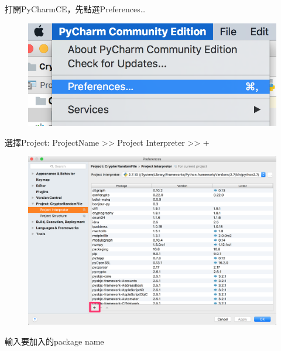 \documentclass[12pt,a4paper]{article}
\begin{document}
{
\fontsize{14pt}{10pt} %
\selectfont %
打開PyCharmCE，先點選Preferences…

\begin{figure}[ht]
	\begin{center}
		\includegraphics[scale=0.3]{image/PyCharm1.png}
	\end{center}
\end{figure}

\newpage %
選擇Project: ProjectName >> Project Interpreter >> +

\begin{figure}[ht]
	\begin{center}
		\includegraphics[scale=0.2]{image/PyCharm2.png}
	\end{center}
\end{figure}

輸入要加入的package name

}
\end{document}
